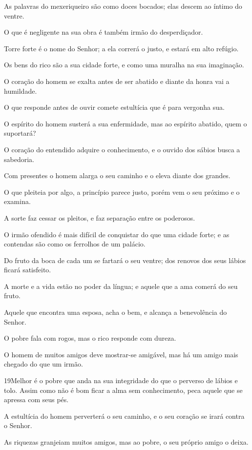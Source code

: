 As palavras do mexeriqueiro são como doces bocados; elas descem ao
íntimo do ventre.

O que é negligente na sua obra é também irmão do desperdiçador.

Torre forte é o nome do Senhor; a ela correrá o justo, e estará
em alto refúgio.

Os bens do rico são a sua cidade forte, e como uma muralha na sua
imaginação.

O coração do homem se exalta antes de ser abatido e diante da
honra vai a humildade.

O que responde antes de ouvir comete estultícia que é para
vergonha sua.

O espírito do homem susterá a sua enfermidade, mas ao espírito
abatido, quem o suportará?

O coração do entendido adquire o conhecimento, e o ouvido dos
sábios busca a sabedoria.

Com presentes o homem alarga o seu caminho e o eleva diante dos
grandes.

O que pleiteia por algo, a princípio parece justo, porém vem o
seu próximo e o examina.

A sorte faz cessar os pleitos, e faz separação entre os
poderosos.

O irmão ofendido é mais difícil de conquistar do que uma cidade
forte; e as contendas são como os ferrolhos de um palácio.

Do fruto da boca de cada um se fartará o seu ventre; dos renovos
dos seus lábios ficará satisfeito.

A morte e a vida estão no poder da língua; e aquele que a ama
comerá do seu fruto.

Aquele que encontra uma esposa, acha o bem, e alcança a
benevolência do Senhor.

O pobre fala com rogos, mas o rico responde com dureza.

O homem de muitos amigos deve mostrar-se amigável, mas há um
amigo mais chegado do que um irmão.

\medskip

\lettrine{19}{}Melhor é o pobre que anda na sua integridade do
que o perverso de lábios e tolo.  Assim como não é
bom ficar a alma sem conhecimento, peca aquele que se apressa com
seus pés.

A estultícia do homem perverterá o seu caminho, e o seu coração se
irará contra o Senhor.

As riquezas granjeiam muitos amigos, mas ao pobre, o seu próprio
amigo o deixa.


